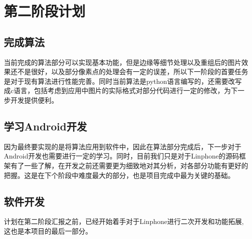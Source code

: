 \documentclass[12pt]{extarticle}
\newcommand{\<}{\langle}
\renewcommand{\>}{\rangle}
\theoremstyle{definition}
\begin{document}
\section{第二阶段计划}
\subsection{完成算法}
\par{\qquad 当前完成的算法部分可以实现基本功能，但是边缘等细节处理以及重组后的图片效果还不是很好，以及部分像素点的处理会有一定的误差，所以下一阶段的首要任务是对于现有算法进行性能完善。同时当前算法是python语言编写的，还需要改写成c语言，包括考虑到应用中图片的实际格式对部分代码进行一定的修改，为下一步开发提供便利。}
\subsection{学习Android开发}
\par{\qquad 因为最终要实现的是将算法应用到软件中，因此在算法部分完成后，下一步对于Android开发也需要进行一定的学习。同时，目前我们只是对于Linphone的源码框架有了一些了解，在开发之前还需要更为细致地对其分析，对各部分功能有更好的把握。这是在下个阶段中难度最大的部分，也是项目完成中最为关键的基础。}
\subsection{软件开发}
\par{\qquad 计划在第二阶段汇报之前，已经开始着手对于Linphone进行二次开发和功能拓展,这也是本项目的最后一部分。}
\end{document}
